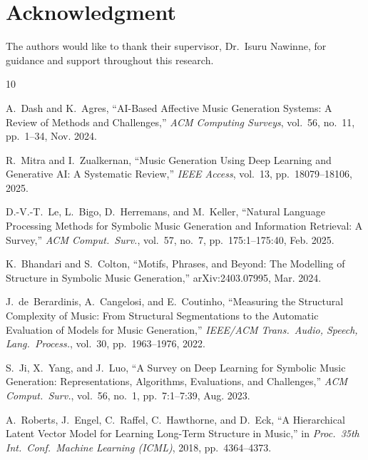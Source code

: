 \documentclass[conference]{IEEEtran}
\begin{document}
\section*{Acknowledgment}

The authors would like to thank their supervisor, Dr.\ Isuru Nawinne,
for guidance and support throughout this research.


% 

\begin{thebibliography}{10}

A.~Dash and K.~Agres,
``AI-Based Affective Music Generation Systems: A Review of Methods and Challenges,''
\textit{ACM Computing Surveys}, vol.~56, no.~11, pp.~1--34, Nov. 2024.

R.~Mitra and I.~Zualkernan,
``Music Generation Using Deep Learning and Generative AI: A Systematic Review,''
\textit{IEEE Access}, vol.~13, pp.~18079--18106, 2025.

D.-V.-T.~Le, L.~Bigo, D.~Herremans, and M.~Keller,
``Natural Language Processing Methods for Symbolic Music Generation and
Information Retrieval: A Survey,''
\textit{ACM Comput.\ Surv.}, vol.~57, no.~7, pp.~175:1--175:40, Feb. 2025.

K.~Bhandari and S.~Colton,
``Motifs, Phrases, and Beyond: The Modelling of Structure in Symbolic Music Generation,''
arXiv:2403.07995, Mar. 2024.

J.~de~Berardinis, A.~Cangelosi, and E.~Coutinho,
``Measuring the Structural Complexity of Music: From Structural Segmentations
to the Automatic Evaluation of Models for Music Generation,''
\textit{IEEE/ACM Trans.\ Audio, Speech, Lang.\ Process.}, vol.~30,
pp.~1963--1976, 2022.

S.~Ji, X.~Yang, and J.~Luo,
``A Survey on Deep Learning for Symbolic Music Generation: Representations,
Algorithms, Evaluations, and Challenges,''
\textit{ACM Comput.\ Surv.}, vol.~56, no.~1, pp.~7:1--7:39, Aug. 2023.

A.~Roberts, J.~Engel, C.~Raffel, C.~Hawthorne, and D.~Eck,
``A Hierarchical Latent Vector Model for Learning Long-Term Structure in Music,''
in \textit{Proc.\ 35th Int.\ Conf.\ Machine Learning (ICML)}, 2018, pp.~4364--4373.


\end{thebibliography}
\end{document}
